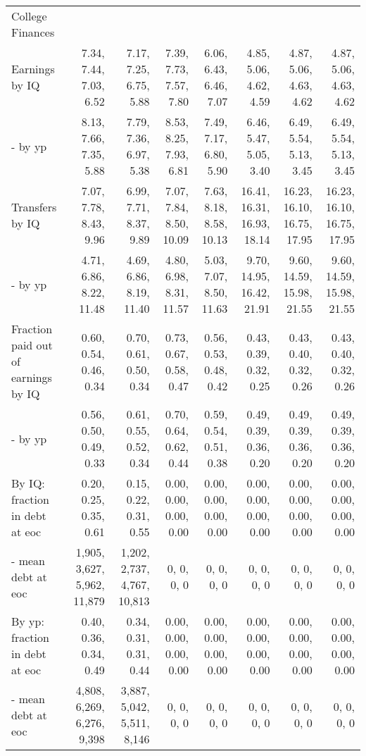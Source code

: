 \begin{tabular}{lrrrrrrr}
\hline
College Finances &   &   &   &   &   &   &   \\ 
Earnings by IQ & 7.34, 7.44, 7.03, 6.52  & 7.17, 7.25, 6.75, 5.88  & 7.39, 7.73, 7.57, 7.80  & 6.06, 6.43, 6.46, 7.07  & 4.85, 5.06, 4.62, 4.59  & 4.87, 5.06, 4.63, 4.62  & 4.87, 5.06, 4.63, 4.62  \\ 
- by yp & 8.13, 7.66, 7.35, 5.88  & 7.79, 7.36, 6.97, 5.38  & 8.53, 8.25, 7.93, 6.81  & 7.49, 7.17, 6.80, 5.90  & 6.46, 5.47, 5.05, 3.40  & 6.49, 5.54, 5.13, 3.45  & 6.49, 5.54, 5.13, 3.45  \\ 
Transfers by IQ & 7.07, 7.78, 8.43, 9.96  & 6.99, 7.71, 8.37, 9.89  & 7.07, 7.84, 8.50, 10.09  & 7.63, 8.18, 8.58, 10.13  & 16.41, 16.31, 16.93, 18.14  & 16.23, 16.10, 16.75, 17.95  & 16.23, 16.10, 16.75, 17.95  \\ 
- by yp & 4.71, 6.86, 8.22, 11.48  & 4.69, 6.86, 8.19, 11.40  & 4.80, 6.98, 8.31, 11.57  & 5.03, 7.07, 8.50, 11.63  & 9.70, 14.95, 16.42, 21.91  & 9.60, 14.59, 15.98, 21.55  & 9.60, 14.59, 15.98, 21.55  \\ 
Fraction paid out of earnings by IQ & 0.60, 0.54, 0.46, 0.34  & 0.70, 0.61, 0.50, 0.34  & 0.73, 0.67, 0.58, 0.47  & 0.56, 0.53, 0.48, 0.42  & 0.43, 0.39, 0.32, 0.25  & 0.43, 0.40, 0.32, 0.26  & 0.43, 0.40, 0.32, 0.26  \\ 
- by yp & 0.56, 0.50, 0.49, 0.33  & 0.61, 0.55, 0.52, 0.34  & 0.70, 0.64, 0.62, 0.44  & 0.59, 0.54, 0.51, 0.38  & 0.49, 0.39, 0.36, 0.20  & 0.49, 0.39, 0.36, 0.20  & 0.49, 0.39, 0.36, 0.20  \\ 
By IQ: fraction in debt at eoc & 0.20, 0.25, 0.35, 0.61  & 0.15, 0.22, 0.31, 0.55  & 0.00, 0.00, 0.00, 0.00  & 0.00, 0.00, 0.00, 0.00  & 0.00, 0.00, 0.00, 0.00  & 0.00, 0.00, 0.00, 0.00  & 0.00, 0.00, 0.00, 0.00  \\ 
- mean debt at eoc & 1,905, 3,627, 5,962, 11,879  & 1,202, 2,737, 4,767, 10,813  & 0, 0, 0, 0  & 0, 0, 0, 0  & 0, 0, 0, 0  & 0, 0, 0, 0  & 0, 0, 0, 0  \\ 
By yp: fraction in debt at eoc & 0.40, 0.36, 0.34, 0.49  & 0.34, 0.31, 0.31, 0.44  & 0.00, 0.00, 0.00, 0.00  & 0.00, 0.00, 0.00, 0.00  & 0.00, 0.00, 0.00, 0.00  & 0.00, 0.00, 0.00, 0.00  & 0.00, 0.00, 0.00, 0.00  \\ 
- mean debt at eoc & 4,808, 6,269, 6,276, 9,398  & 3,887, 5,042, 5,511, 8,146  & 0, 0, 0, 0  & 0, 0, 0, 0  & 0, 0, 0, 0  & 0, 0, 0, 0  & 0, 0, 0, 0  \\ 
\hline
\end{tabular}%
